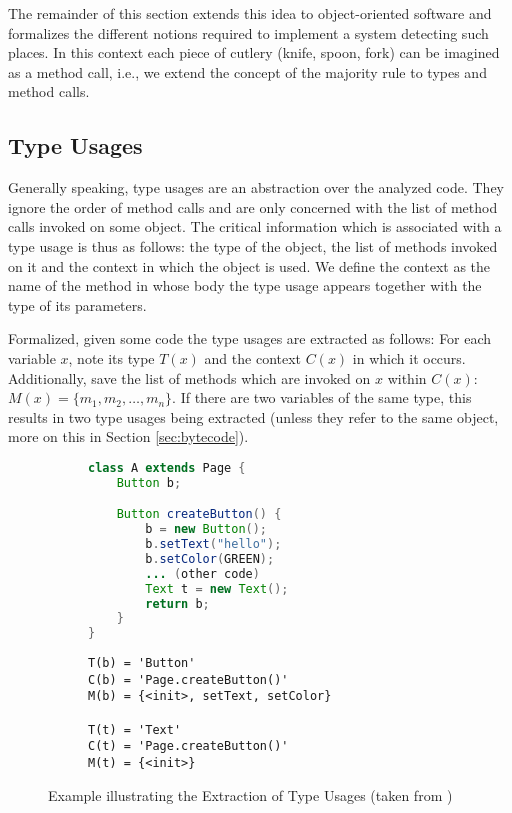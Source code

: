 The remainder of this section extends this idea to object-oriented software and formalizes the different notions required to implement a system detecting such places.
In this context each piece of cutlery (knife, spoon, fork) can be imagined as a method call, i.e., we extend the concept of the majority rule to types and method calls.

\subsection{Type Usages}

Generally speaking, type usages are an abstraction over the analyzed code.
They ignore the order of method calls and are only concerned with the list of method calls invoked on some object.
The critical information which is associated with a type usage is thus as follows: the type of the object, the list of methods invoked on it and the context in which the object is used.
We define the context as the name of the method in whose body the type usage appears together with the type of its parameters.

Formalized, given some code the type usages are extracted as follows:
For each variable $x$, note its type $T(x)$ and the context $C(x)$ in which it occurs.
Additionally, save the list of methods which are invoked on $x$ within $C(x)$: $M(x) =\{ m_1, m_2, \dotsc, m_n\}$.
If there are two variables of the same type, this results in two type usages being extracted (unless they refer to the same object, more on this in Section \ref{sec:bytecode}).

\begin{figure}[h]
    \begin{subfigure}[c]{0.5\textwidth}
        \begin{lstlisting}[language=java, basicstyle=\small]
class A extends Page {
    Button b;

    Button createButton() {
        b = new Button();
        b.setText("hello");
        b.setColor(GREEN);
        ... (other code)
        Text t = new Text();
        return b;
    }
}
        \end{lstlisting}
    \end{subfigure}
    \begin{subfigure}[c]{0.5\textwidth}
        \begin{lstlisting}[basicstyle=\small]
T(b) = 'Button'
C(b) = 'Page.createButton()'
M(b) = {<init>, setText, setColor}

T(t) = 'Text'
C(t) = 'Page.createButton()'
M(t) = {<init>}
        \end{lstlisting}
    \end{subfigure}
    \caption{Example illustrating the Extraction of Type Usages (taken from \cite{monperrus2013detecting})}
    \label{fig:tu_example}
\end{figure}

